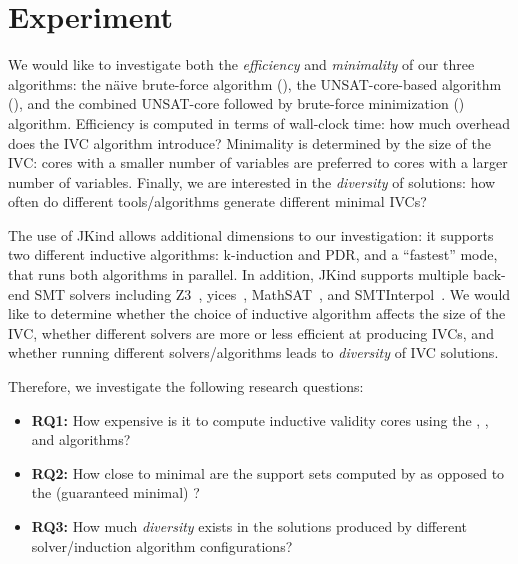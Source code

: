 \section{Experiment}
\label{sec:experiment}


We would like to investigate both the {\em efficiency} and {\em minimality} of our three algorithms: the n{\"a}ive brute-force algorithm (\bfalg), the UNSAT-core-based algorithm (\ucalg), and the combined UNSAT-core followed by brute-force minimization (\ucbfalg) algorithm.  Efficiency is computed in terms of wall-clock time: how much overhead does the IVC algorithm introduce?  Minimality is determined by the size of the IVC: cores with a smaller number of variables are preferred to cores with a larger number of variables.  Finally, we are interested in the {\em diversity} of solutions: how often do different tools/algorithms generate different minimal IVCs?

The use of JKind allows additional dimensions to our investigation: it supports two different inductive algorithms: k-induction and PDR, and a ``fastest'' mode, that runs both algorithms in parallel.  In addition, JKind supports multiple back-end SMT solvers including Z3~\cite{DeMoura08:z3}, yices~\cite{Dutertre06:yices}, MathSAT~\cite{Cimatti2013:MathSAT}, and SMTInterpol~\cite{Christ2012:SMTInterpol}.  We would like to determine whether the choice of inductive algorithm affects the size of the IVC, whether different solvers are more or less efficient at producing IVCs, and whether running different solvers/algorithms leads to {\em diversity} of IVC solutions.

Therefore, we investigate the following research questions:
\begin{itemize}
    \item \textbf{RQ1:} How expensive is it to compute inductive validity cores using the \bfalg, \ucalg, and \ucbfalg algorithms?
    \item \textbf{RQ2:} How close to minimal are the support sets computed by \ucalg as opposed to the (guaranteed minimal) \ucbfalg?
    \item \textbf{RQ3:} How much {\em diversity} exists in the solutions produced by different solver/induction algorithm configurations?
\end{itemize}

